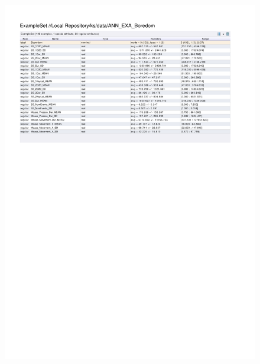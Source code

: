 \begin{figure}[htp]
  \centerline{\includegraphics[trim=0 535 0 60,clip,width=16.09cm]{results/ANN_EXA_Boredom.pdf}} \caption{
} \label{ANN_EXA_Boredom}
\end{figure}


